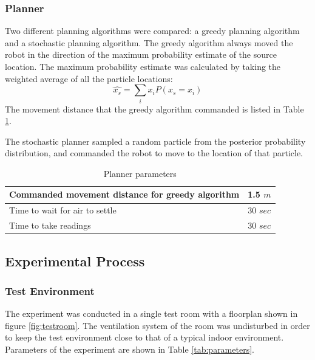 \documentclass[submit, 12pt]{aiaa-pretty-modified}
\newcommand{\tablewidthtwo}[0]{3in}
\begin{document}
\subsubsection{Planner}
Two different planning algorithms were compared: a greedy planning algorithm and
a stochastic planning algorithm. The greedy algorithm always moved the robot
in the direction of the maximum probability estimate of the source location. The
maximum probability estimate was calculated by taking the weighted average of
all the particle locations:
\[\hat{x_s} = \displaystyle\sum\limits_{i} x_i P(x_s = x_i) \]
The movement distance that the greedy algorithm commanded is listed in Table
\ref{tab:planner-parameters}.

The stochastic planner sampled a random particle from the posterior probability 
distribution, and commanded the robot to move to the location of that particle. 

\begin{table}
\caption{Planner parameters}
\begin{center}
\begin{tabular}{|p{\tablewidthtwo}|p{\tablewidthtwo}|}
\hline
Commanded movement distance for greedy algorithm & 1.5 $m$ \\ \hline
Time to wait for air to settle & 30 $sec$ \\ \hline
Time to take readings &  30 $sec$ \\ \hline
\end{tabular}
\end{center}
\label{tab:planner-parameters}
\end{table}

\subsection{Experimental Process}
\subsubsection{Test Environment}

The experiment was conducted in a single test room with a floorplan
shown in figure \ref{fig:testroom}. The ventilation system of the room was undisturbed in order to keep the test
environment close to that of a typical indoor environment. Parameters of the
experiment are shown in Table \ref{tab:parameters}.
\end{document}
